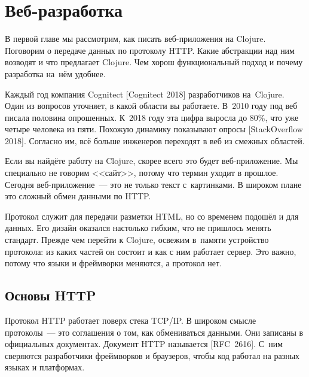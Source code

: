 \chapter{Веб-разработка}

\begin{teaser}
В первой главе мы рассмотрим, как писать веб-приложения на Clojure. Поговорим о
передаче данных по протоколу HTTP. Какие абстракции над ним возводят и что
предлагает Clojure. Чем хорош функциональный подход и почему разработка на~нём
удобнее.
\end{teaser}


Каждый год компания Cognitect
[Cognitect 2018]
разработчиков на~Clojure. Один из вопросов уточняет, в какой области вы
работаете. В~2010 году под веб писала половина опрошенных. К~2018 году эта цифра
выросла до 80\%, что уже четыре человека из пяти. Похожую динамику показывают опросы
[Stack\-Overflow 2018].
Согласно им, всё больше инженеров переходят в веб из смежных областей.

Если вы найдёте работу на Clojure, скорее всего это будет веб-при\-ло\-же\-ние. Мы
специально не говорим <<сайт>>, потому что термин уходит в прошлое. Сегодня
веб-приложение~--- это не только текст с~картинками. В широком плане это сложный
обмен данными по HTTP.

Протокол служит для передачи разметки HTML, но со временем подошёл и для
данных. Его дизайн оказался настолько гибким, что не пришлось менять
стандарт. Прежде чем перейти к Clojure, освежим в~памяти устройство протокола:
из каких частей он состоит и как с ним работает сервер. Это важно, потому что
языки и фреймворки меняются, а протокол нет.

\section{Основы HTTP}


Протокол HTTP работает поверх стека TCP/IP. В широком смысле протоколы~--- это
соглашения о том, как обмениваться данными. Они записаны в официальных
документах. Документ HTTP называется [RFC~2616].
С~ним сверяются разработчики фреймворков и браузеров, чтобы код работал
на разных языках и платформах.

